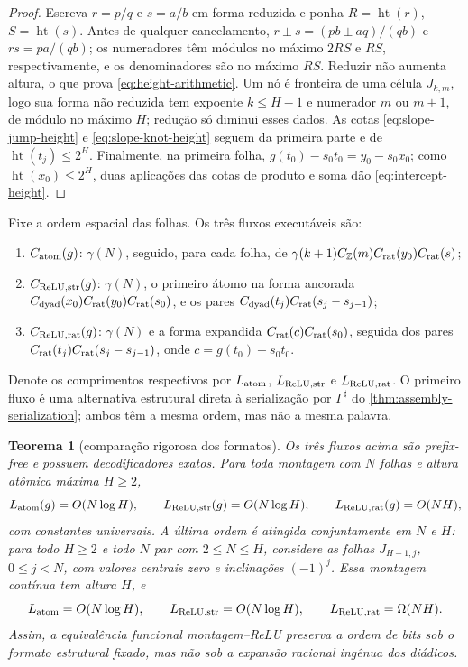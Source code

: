 \documentclass[11pt,a4paper]{article}
\newtheorem{theorem}{Teorema}[section]
\theoremstyle{definition}
\theoremstyle{remark}
\newcommand{\height}{\operatorname{ht}}
\begin{document}
\begin{proof}
Escreva $r=p/q$ e $s=a/b$ em forma reduzida e ponha
$R=\height(r)$, $S=\height(s)$. Antes de qualquer cancelamento,
$r\pm s=(pb\pm aq)/(qb)$ e $rs=pa/(qb)$; os numeradores têm módulos no
máximo $2RS$ e $RS$, respectivamente, e os denominadores são no máximo
$RS$. Reduzir não aumenta altura, o que prova
\eqref{eq:height-arithmetic}. Um nó é fronteira de uma célula
$J_{k,m}$, logo sua forma não reduzida tem expoente $k\le H-1$ e numerador
$m$ ou $m+1$, de módulo no máximo $H$; redução só diminui esses dados. As
cotas \eqref{eq:slope-jump-height} e \eqref{eq:slope-knot-height} seguem da
primeira parte e de $\height(t_j)\le2^H$. Finalmente, na primeira folha,
$g(t_0)-s_0t_0=y_0-s_0x_0$; como
$\height(x_0)\le2^H$, duas aplicações das cotas de produto e soma dão
\eqref{eq:intercept-height}.
\end{proof}

Fixe a ordem espacial das folhas. Os três fluxos executáveis são:
\begin{enumerate}[label=(\roman*),leftmargin=2.1em]
 \item $C_{\rm atom}(g)$: $\gamma(N)$, seguido, para cada folha, de
 $\gamma(k+1)C_{\mathbb Z}(m)C_{\rm rat}(y_0)C_{\rm rat}(s)$;
 \item $C_{\rm ReLU,str}(g)$: $\gamma(N)$, o primeiro átomo na forma ancorada
 $C_{\rm dyad}(x_0)C_{\rm rat}(y_0)C_{\rm rat}(s_0)$, e os pares
 $C_{\rm dyad}(t_j)C_{\rm rat}(s_j-s_{j-1})$;
 \item $C_{\rm ReLU,rat}(g)$: $\gamma(N)$ e a forma expandida
 $C_{\rm rat}(c)C_{\rm rat}(s_0)$, seguida dos pares
 $C_{\rm rat}(t_j)C_{\rm rat}(s_j-s_{j-1})$, onde
 $c=g(t_0)-s_0t_0$.
\end{enumerate}
Denote os comprimentos respectivos por $L_{\rm atom}$,
$L_{\rm ReLU,str}$ e $L_{\rm ReLU,rat}$. O primeiro fluxo é uma alternativa
estrutural direta à serialização por $\Gamma^\sharp$ do
\cref{thm:assembly-serialization}; ambos têm a mesma ordem, mas não a mesma
palavra.

\begin{theorem}[comparação rigorosa dos formatos]
\label{thm:coding-formats}
Os três fluxos acima são prefix-free e possuem decodificadores exatos. Para
toda montagem com $N$ folhas e altura atômica máxima $H\ge2$,
\begin{equation}
 L_{\rm atom}(g)=O(N\log H),\qquad
 L_{\rm ReLU,str}(g)=O(N\log H),\qquad
 L_{\rm ReLU,rat}(g)=O(NH),
 \label{eq:coding-format-orders}
\end{equation}
com constantes universais. A última ordem é atingida conjuntamente em $N$ e
$H$: para todo $H\ge2$ e todo $N$ par com $2\le N\le H$, considere as folhas
$J_{H-1,j}$, $0\le j<N$, com valores centrais zero e inclinações $(-1)^j$.
Essa montagem contínua tem altura $H$, e
\begin{equation}
 L_{\rm atom}=O(N\log H),\qquad
 L_{\rm ReLU,str}=O(N\log H),\qquad
 L_{\rm ReLU,rat}=\Omega(NH).
 \label{eq:coding-gap-family}
\end{equation}
Assim, a equivalência funcional montagem--ReLU preserva a ordem de bits sob o
formato estrutural fixado, mas não sob a expansão racional ingênua dos
diádicos.
\end{theorem}
\end{document}
